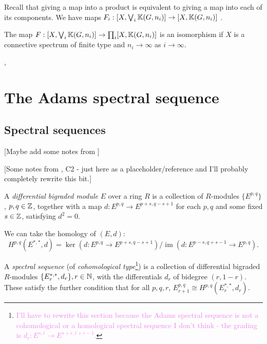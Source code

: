 \documentclass{MetricNotes2023}
\def\bb{\ensuremath\mathbb}
\def\inte{\ensuremath\mathbb{Z}}
\def\nat{\ensuremath\mathbb{N}}
\DeclareMathOperator{\im}{im}
\def\textcolour{\textcolor}
\begin{document}
Recall that giving a map into a product is equivalent to giving a map into each of its components. We have maps \(F_i : [X, \bigvee_i \bb{K}(G,n_i)]\to [X,\bb{K}(G,n_i)]\) .

\begin{proposition}\label{2503231218}
The map \(F : [X, \bigvee_i \bb{K}(G,n_i)]\to \prod_i [X,\bb{K}(G,n_i)]\) is an isomorphism if \(X\) is a connective spectrum of finite type and \(n_i\to \infty\) as \(i\to\infty\). 
\end{proposition}

\autocite{ass}, \autocite{hatcher5}

\section{The Adams spectral sequence}

\subsection{Spectral sequences}\label{2504041910}

[Maybe add some notes from \autocite{ass}]

[Some notes from \autocite{spectral_sequences}, C2 - just here as a placeholder/reference and I'll probably completely rewrite this bit.]

\begin{definition}
A \textit{differential bigraded module} \(E\) over a ring \(R\) is a collection of \(R\)-modules \(\{E^{p, q}\}\), \(p, q\in \inte\), together with a map \(d : E^{p, q} \to E^{p+s, q-s+1}\) for each \(p, q\) and some fixed \(s \in \inte\), satisfying \(d^2=0\). 
\end{definition}

We can take the homology of \((E, d)\):
\[H^{p, q}(E^{*, *}, d)=\ker(d : E^{p, q}\to E^{p+s, q-s+1})/\im(d : E^{p-s, q+s-1}\to E^{p, q}).\]

\begin{definition}
A \textit{spectral sequence} (of \textit{cohomological type}\footnote{\textcolour{violet}{I'll have to rewrite this section because the Adams spectral sequence is not a cohomological or a homological spectral sequence I don't think - the grading is \(d_r : E^{s,t}\to E^{s+r,t+r-1}\).}}) is a collection of differential bigraded \(R\)-modules \(\{E^{*, *}_r, d_r\}, r \in \nat\), with the differentials \(d_r\) of bidegree \((r, 1-r)\). These satisfy the further condition that for all \(p, q, r\), \(E^{p, q}_{r+1}\cong H^{p, q}(E_r^{*, *}, d_r)\).
\end{definition}
\end{document}
